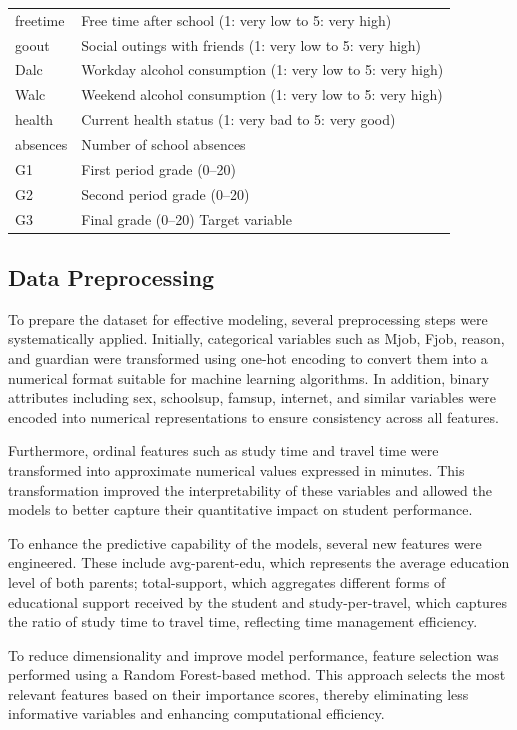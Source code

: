 \documentclass[conference]{IEEEtran}
\begin{document}
\begin{table}[htpb]
\begin{tabular}{|l|l|}
freetime & Free time after school (1: very low to 5: very high) \\
goout & Social outings with friends (1: very low to 5: very high) \\
Dalc & Workday alcohol consumption (1: very low to 5: very high) \\
Walc & Weekend alcohol consumption (1: very low to 5: very high) \\
health & Current health status (1: very bad to 5: very good) \\
absences & Number of school absences \\
G1 & First period grade (0–20) \\
G2 & Second period grade (0–20) \\
G3 & Final grade (0–20) Target variable \\

\hline
\end{tabular}
\end{table}

\subsection{Data Preprocessing}
To prepare the dataset for effective modeling, several preprocessing steps were systematically applied. Initially, categorical variables such as Mjob, Fjob, reason, and guardian were transformed using one-hot encoding to convert them into a numerical format suitable for machine learning algorithms. In addition, binary attributes including sex, schoolsup, famsup, internet, and similar variables were encoded into numerical representations to ensure consistency across all features. 

Furthermore, ordinal features such as study time and travel time were transformed into approximate numerical values expressed in minutes. This transformation improved the interpretability of these variables and allowed the models to better capture their quantitative impact on student performance. 

To enhance the predictive capability of the models, several new features were engineered. These include avg-parent-edu, which represents the average education level of both parents; total-support, which aggregates different forms of educational support received by the student and study-per-travel, which captures the ratio of study time to travel time, reflecting time management efficiency. 

To reduce dimensionality and improve model performance, feature selection was performed using a Random Forest-based method. This approach selects the most relevant features based on their importance scores, thereby eliminating less informative variables and enhancing computational efficiency. 
\end{document}
